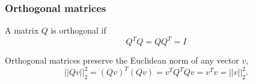 \documentclass[10pt]{beamer}
\begin{document}
\begin{frame}
\frametitle{Orthogonal matrices}

\begin{definition}
A matrix $Q$ is orthogonal if $$Q^TQ = QQ^T = I$$
\end{definition}

\bigskip

Orthogonal matrices preserve the Euclidean norm of any vector $v,$ $$||Qv||^2_2 = (Qv)^T(Qv) =v^TQ^TQv = v^Tv = ||v||^2_2.$$  

\end{frame}
\end{document}
